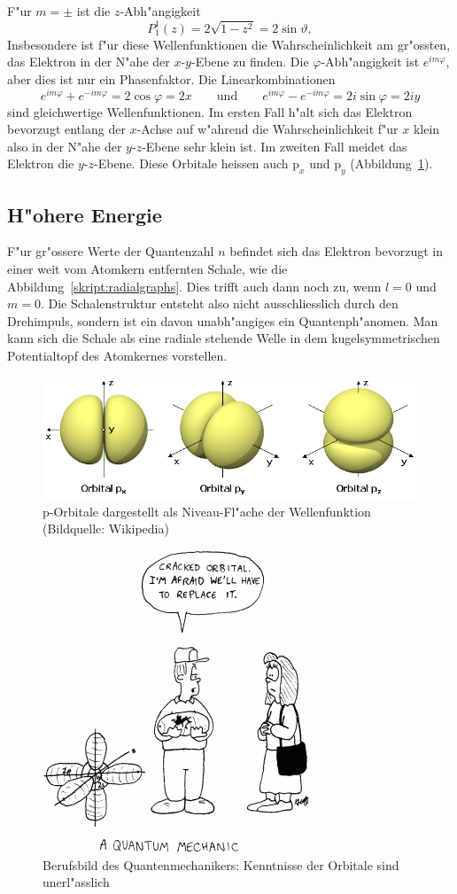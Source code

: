 F"ur $m=\pm$ ist die $z$-Abh"angigkeit
\[
P_1^1(z)=2\sqrt{1-z^2} = 2\sin\vartheta,
\]
Insbesondere ist f"ur diese Wellenfunktionen die Wahrscheinlichkeit 
am gr"ossten, das Elektron in der N"ahe der $x$-$y$-Ebene zu finden.
Die $\varphi$-Abh"angigkeit ist $e^{im\varphi}$, aber dies ist
nur ein Phasenfaktor.
Die Linearkombinationen
\[
e^{im\varphi}+e^{-im\varphi}=2\cos\varphi=2x
\qquad\text{und}\qquad
e^{im\varphi}-e^{-im\varphi}=2i\sin\varphi=2iy
\]
sind gleichwertige Wellenfunktionen.
Im ersten Fall h"alt sich das Elektron bevorzugt entlang der $x$-Achse
auf w"ahrend die Wahrscheinlichkeit f"ur $x$ klein also in der N"ahe der
$y$-$z$-Ebene sehr klein ist.
Im zweiten Fall meidet das Elektron die $y$-$z$-Ebene.
Diese Orbitale heissen auch $\text{p}_x$ und $\text{p}_y$
(Abbildung~\ref{skript:porbitale}).

\subsection{H"ohere Energie}
F"ur gr"ossere Werte der Quantenzahl $n$ befindet sich das Elektron
bevorzugt in einer weit vom Atomkern entfernten Schale, wie die
Abbildung~\ref{skript:radialgraphs}.
Dies trifft auch dann noch zu, wenn $l=0$ und $m=0$.
Die Schalenstruktur entsteht also nicht ausschliesslich durch den 
Drehimpuls, sondern ist ein davon unabh"angiges ein Quantenph"anomen.
Man kann sich die Schale als eine radiale stehende Welle in dem
kugelsymmetrischen Potentialtopf des Atomkernes vorstellen.

\begin{figure}
\centering
\includegraphics[width=\hsize]{images/orbital.png}
\caption{p-Orbitale dargestellt als Niveau-Fl"ache der Wellenfunktion
(Bildquelle: Wikipedia)
\label{skript:porbitale}}
\end{figure}

\begin{figure}
\centering
\includegraphics[width=0.4\hsize]{images/crackedorbital.png}
\caption{Berufsbild des Quantenmechanikers: Kenntnisse der Orbitale
sind unerl"asslich\label{skript:crackedorbital}}
\end{figure}
